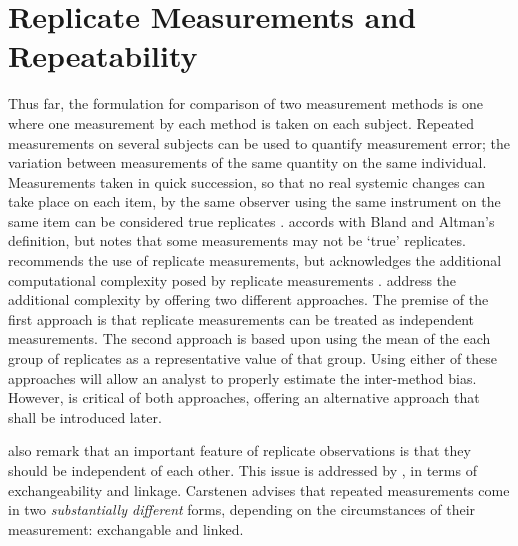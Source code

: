 \documentclass[12pt, a4paper]{report}
\theoremstyle{plain}
\theoremstyle{definition}
\theoremstyle{remark}
\begin{document}
	\section{Replicate Measurements and Repeatability}
Thus far, the formulation for comparison of two measurement
methods is one where one measurement by each method is taken on
each subject. Repeated measurements on several subjects can be used to quantify measurement error; the variation between measurements of the same quantity on the same individual. Measurements taken in quick succession, so that no real systemic changes can take place on each item,  by the same observer using the same instrument on the same item can be considered true replicates \citep{BA99}. \citet{ARoy2009} accords with Bland and Altman's definition, but notes that some measurements may not be `true' replicates.
 \citet{BXC2008} recommends the use of replicate measurements, but acknowledges the additional computational complexity posed by replicate measurements . \citet*{BA86} address the additional complexity by offering two different approaches. The premise of the first approach is that replicate measurements can be treated as independent measurements. The second approach is based upon using the mean of the each group of
		replicates as a representative value of that group. Using either of these approaches will allow an analyst to properly estimate the inter-method bias. However, \citet{BXC2008} is critical of both approaches, offering an alternative approach that shall be introduced later.
		
\citet{BA99} also remark that an important feature of replicate observations is that they should be independent
of each other. This issue is addressed by \citet{BXC2010}, in terms of exchangeability and linkage. Carstenen advises that repeated measurements come in two \emph{substantially different} forms, depending on the circumstances of their measurement: exchangable and linked.
		
%		
%		
%	
	
%	
	
\end{document}

